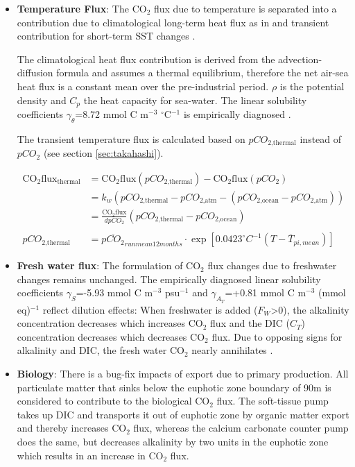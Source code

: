 \begin{itemize}
 \item \textbf{Temperature Flux}: The CO$_2$ flux due to temperature is separated into a contribution due to climatological long-term heat flux as in \citep{Lauderdale2016a} and transient contribution for short-term SST changes \citep{Takahashi2002}.

The climatological heat flux contribution is derived from the advection-diffusion formula and assumes a thermal equilibrium, therefore the net air-sea heat flux is a constant mean over the pre-industrial period. $\rho$ is the potential density and $C_p$ the heat capacity for sea-water. The linear solubility coefficients $\gamma_\theta$=8.72 mmol C m$^{-3}$ $^\circ$C$^{-1}$ is empirically diagnosed \citep{Lauderdale2016a}.

The transient temperature flux is calculated based on $pCO_{\text{2,thermal}}$ instead of $pCO_{\text{2}}$ (see section \ref{sec:takahashi}).

\begin{align*}
\text{CO}_2 \text{flux}_{\text{thermal}} &= \text{CO}_2\text{flux}(pCO_{\text{2,thermal}}) - \text{CO}_2\text{flux}(pCO_{\text{2}}) \\
 &= k_w \left( pCO_{\text{2,thermal}}-pCO_{\text{2,atm}} - \left( pCO_{\text{2,ocean}} - pCO_{\text{2,atm}} \right) \right) \\
  &= \frac{\text{CO}_2\text{flux}}{dpCO_2} \left( pCO_{\text{2,thermal}} - pCO_{\text{2,ocean}} \right)  \\ \\
 pCO_{\text{2,thermal}} &= \overline{pCO_2}_{runmean12months} \cdot \exp \left[ 0.0423 ^{\circ}C^{-1}\left( T - \overline{T}_{pi,mean} \right) \right]  
\end{align*}


\item \textbf{Fresh water flux}: The formulation of CO$_2$ flux changes due to freshwater changes remains unchanged. The empirically diagnosed linear solubility coefficients $\gamma_S$=-5.93 mmol C m$^{-3}$ psu$^{-1}$ and $\gamma_{A_T}$=+0.81 mmol C m$^{-3}$ (mmol eq)$^{-1}$ reflect dilution effects: When freshwater is added ($F_W $\textgreater$ 0$), the alkalinity concentration decreases which increases CO$_2$ flux and the DIC ($C_T$) concentration decreases which decreases CO$_2$ flux. Due to opposing signs for alkalinity and DIC, the fresh water CO$_2$ nearly annihilates \citep{Lauderdale2016a}.  

\item \textbf{Biology}: There is a bug-fix impacts of export due to primary production. All particulate matter that sinks below the euphotic zone boundary of 90m is considered to contribute to the biological CO$_2$ flux. The soft-tissue pump takes up DIC and transports it out of euphotic zone by organic matter export and thereby increases CO$_2$ flux, whereas the calcium carbonate counter pump does the same, but decreases alkalinity by two units in the euphotic zone which results in an increase in CO$_2$ flux.


\end{itemize}
